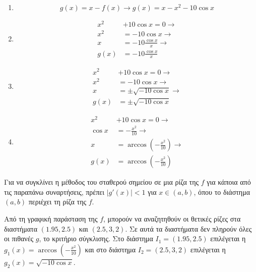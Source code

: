 \documentclass[assignment2.tex]{subfiles}
\begin{document}
\begin{enumerate}
\item 
\begin{equation}
g(x)=x - f(x) \rightarrow g(x)=x - x^2 -10\cos x
\end{equation}
\item 
\begin{equation}
\begin{split}
x^2&+10 \cos x =0 \rightarrow \\
x^2 &=-10\cos x \rightarrow \\
x &= -10\frac{\cos x}{x} \rightarrow \\
g(x) &= -10\frac{\cos x}{x}
\end{split}
\end{equation}
\item 
\begin{equation}
\begin{split}
x^2&+10 \cos x =0 \rightarrow \\
x^2 &=-10\cos x \rightarrow \\
x &= \pm\sqrt{-10\cos x} \rightarrow \\
g(x) &= \pm\sqrt{-10\cos x}
\end{split}
\end{equation}
\item 
\begin{equation}
\begin{split}
x^2&+10 \cos x =0 \rightarrow \\
\cos x &=-\frac{x^2}{10} \rightarrow \\
x &=  \arccos \left(-\frac{x^2}{10}\right) \rightarrow \\
g(x) &= \arccos \left(-\frac{x^2}{10}\right)
\end{split}
\end{equation}
\end{enumerate}

Για να συγκλίνει η μέθοδος του σταθερού σημείου σε μια ρίζα της $f$ για κάποια από τις παραπάνω συναρτήσεις, πρέπει $|g'(x)|<1$ για $x\in(a, b)$, όπου το διάστημα $(a,b)$ περιέχει τη ρίζα της $f$.

Από τη γραφική παράσταση της $f$, μπορούν να αναζητηθούν οι θετικές ρίζες στα διαστήματα $(1.95, 2.5)$ και $(2.5, 3,2)$. Σε αυτά τα διαστήματα δεν πληρούν όλες οι πιθανές $g$, το κριτήριο σύγκλισης. Στο διάστημα $I_1=(1.95, 2.5)$ επιλέγεται η $g_1(x)=\arccos \left(-\frac{x^2}{10}\right)$ και στο διάστημα $I_2=(2.5, 3,2)$ επιλέγεται η $g_2(x)=\sqrt{-10\cos x}$.
\end{document}
